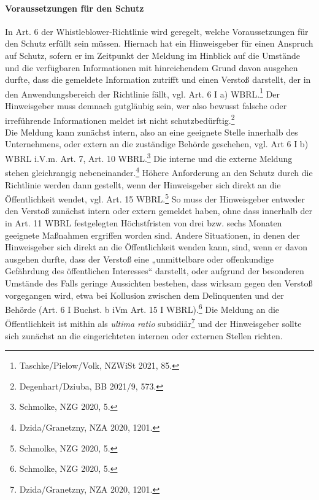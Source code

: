 \paragraph{Voraussetzungen für den Schutz}
In Art. 6 der Whistleblower-Richtlinie wird geregelt, welche Voraussetzungen für den Schutz erfüllt sein müssen.
Hiernach hat ein Hinweisgeber für einen Anspruch auf Schutz, sofern er im Zeitpunkt der Meldung im Hinblick auf die Umstände und die verfügbaren Informationen mit hinreichendem Grund davon ausgehen durfte, dass die gemeldete Information zutrifft und einen Verstoß darstellt, der in den Anwendungsbereich der Richtlinie fällt, vgl. Art. 6 I a) WBRL.\footnote{Taschke/Pielow/Volk, NZWiSt 2021, 85.}
Der Hinweisgeber muss demnach gutgläubig sein, wer also bewusst falsche oder irreführende Informationen meldet ist nicht schutzbedürftig.\footnote{Degenhart/Dziuba, BB 2021/9, 573.}\\
Die Meldung kann zunächst intern, also an eine geeignete Stelle innerhalb des Unternehmens, oder extern an die zuständige Behörde geschehen, vgl. Art 6 I b) WBRL i.V.m. Art. 7, Art. 10 WBRL.\footnote{Schmolke, NZG 2020, 5.}
Die interne und die externe Meldung stehen gleichrangig nebeneinander.\footnote{Dzida/Granetzny, NZA 2020, 1201.}
Höhere Anforderung an den Schutz durch die Richtlinie werden dann gestellt, wenn der Hinweisgeber sich direkt an die Öffentlichkeit wendet, vgl. Art. 15 WBRL.\footnote{Schmolke, NZG 2020, 5.}
So muss der Hinweisgeber entweder den Verstoß zunächst intern oder extern gemeldet haben, ohne dass innerhalb der in Art. 11 WBRL festgelegten Höchstfristen von drei bzw. sechs Monaten geeignete Maßnahmen ergriffen worden sind.
Andere Situationen, in denen der Hinweisgeber sich direkt an die Öffentlichkeit wenden kann, sind, wenn er davon ausgehen durfte, dass der Verstoß eine „unmittelbare oder offenkundige Gefährdung des öffentlichen Interesses“ darstellt, oder aufgrund der besonderen Umstände des Falls geringe Aussichten bestehen, dass wirksam gegen den Verstoß vorgegangen wird, etwa bei Kollusion zwischen dem Delinquenten und der Behörde (Art. 6 I Buchst. b iVm Art. 15 I WBRL).\footnote{Schmolke, NZG 2020, 5.}
Die Meldung an die Öffentlichkeit ist mithin als \textit{ultima ratio} subsidiär\footnote{Dzida/Granetzny, NZA 2020, 1201.} und der Hinweisgeber sollte sich zunächst an die eingerichteten internen oder externen Stellen richten.


